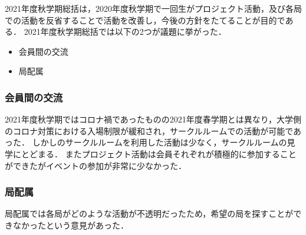 
2021年度秋学期\firstGrade{}総括は，2020年度秋学期で一回生がプロジェクト活動，及び各局での活動を反省することで活動を改善し，今後の方針をたてることが目的である．
2021年度秋学期\firstGrade{}総括では以下の2つが議題に挙がった．
\begin{itemize}
    \item 会員間の交流
    \item 局配属
\end {itemize}

\subsubsection*{会員間の交流}
2021年度秋学期ではコロナ禍であったものの2021年度春学期とは異なり，大学側のコロナ対策における入場制限が緩和され，サークルルームでの活動が可能であった．
しかし\firstGrade{}のサークルルームを利用した活動は少なく，サークルルームの見学にとどまる．
またプロジェクト活動は会員それぞれが積極的に参加することができたがイベントの参加が非常に少なかった．

\subsubsection{局配属}
局配属では各局がどのような活動が不透明だったため，希望の局を探すことができなかったという意見があった．
